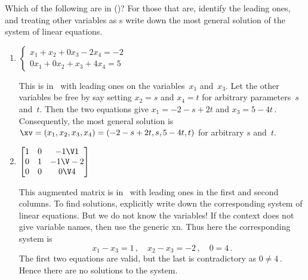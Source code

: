 \begin{example} \label{eg:rref}
Which of the following are in  (\rref)?  
For those that are, identify the leading ones, and treating other variables as s write down the most general solution of the system of linear equations.
\begin{enumerate}
\item \label{eg:rrefi}
\(\begin{cases} x_1+x_2+0x_3-2x_4=-2\\
0x_1+0x_2+x_3+4x_4=5 \end{cases}\)
\begin{solution} 
This is in \rref\ with leading ones on the variables~\(x_1\) and~\(x_3\).
Let the other variables be free by say setting \(x_2=s\) and \(x_4=t\) for arbitrary parameters~\(s\) and~\(t\).
Then the two equations give \(x_1=-2-s+2t\) and \(x_3=5-4t\)\,.
Consequently, the most general solution is \(\xv=(x_1,x_2,x_3,x_4)=(-2-s+2t,s,5-4t,t)\) for arbitrary \(s\) and~\(t\).
\end{solution}

\item \(\begin{bmatrix} 1&0&-1\V1
\\0&1&-1\V-2
\\0&0&0\V4
\end{bmatrix}\)
\begin{solution} 
This augmented matrix is in \rref\ with leading ones in the first and second columns.
To find solutions, explicitly write down the corresponding system of linear equations.
But we do not know the variables!  If the context does not give variable names, then use the generic \hlist xn.
Thus here the corresponding system is
\begin{equation*}
x_1-x_3=1\,,\quad x_2-x_3=-2\,,\quad 0=4\,.
\end{equation*}
The first two equations are valid, but the last is contradictory as \(0\neq 4\)\,.
Hence there are no solutions to the system.
\end{solution}


\end{enumerate}
\end{example}
